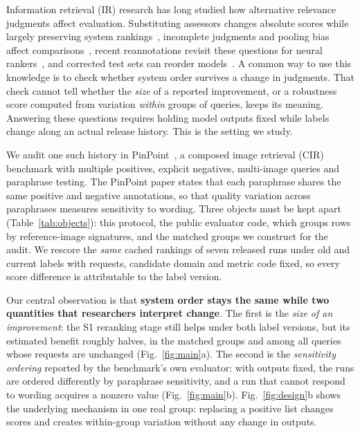\documentclass[conference]{IEEEtran}
\begin{document}
Information retrieval (IR) research has long studied how alternative relevance judgments affect evaluation. Substituting assessors changes absolute scores while largely preserving system rankings~\cite{voorhees2000,sanderson2005}, incomplete judgments and pooling bias affect comparisons~\cite{zobel1998,buckley2004}, recent reannotations revisit these questions for neural rankers~\cite{parry2025,arabzadeh2022}, and corrected test sets can reorder models~\cite{northcutt2021,beyer2020}. A common way to use this knowledge is to check whether system order survives a change in judgments. That check cannot tell whether the \emph{size} of a reported improvement, or a robustness score computed from variation \emph{within} groups of queries, keeps its meaning. Answering these questions requires holding model outputs fixed while labels change along an actual release history. This is the setting we study.

We audit one such history in PinPoint~\cite{pinpoint}, a composed image retrieval (CIR) benchmark with multiple positives, explicit negatives, multi-image queries and paraphrase testing. The PinPoint paper states that each paraphrase shares the same positive and negative annotations, so that quality variation across paraphrases measures sensitivity to wording. Three objects must be kept apart (Table~\ref{tab:objects}): this protocol, the public evaluator code, which groups rows by reference-image signatures, and the matched groups we construct for the audit. We rescore the \emph{same} cached rankings of seven released runs under old and current labels with requests, candidate domain and metric code fixed, so every score difference is attributable to the label version.

Our central observation is that \textbf{system order stays the same while two quantities that researchers interpret change}. The first is the \emph{size of an improvement}: the S1 reranking stage still helps under both label versions, but its estimated benefit roughly halves, in the matched groups and among all queries whose requests are unchanged (Fig.~\ref{fig:main}a). The second is the \emph{sensitivity ordering} reported by the benchmark's own evaluator: with outputs fixed, the runs are ordered differently by paraphrase sensitivity, and a run that cannot respond to wording acquires a nonzero value (Fig.~\ref{fig:main}b). Fig.~\ref{fig:design}b shows the underlying mechanism in one real group: replacing a positive list changes scores and creates within-group variation without any change in outputs.
\end{document}

